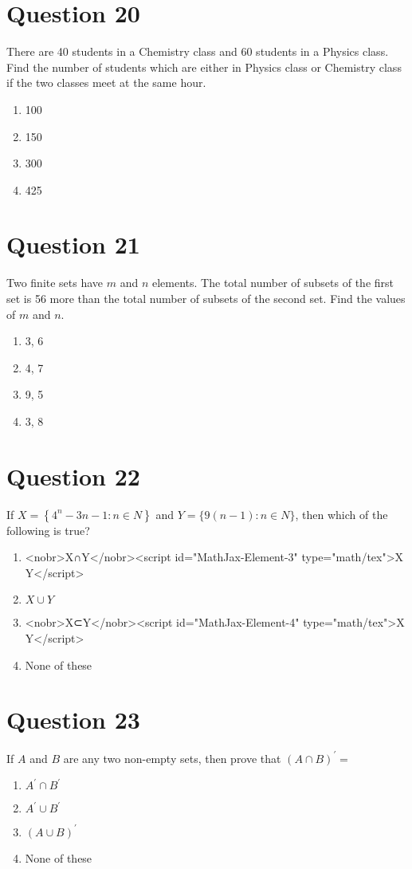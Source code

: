 \documentclass{article}
\begin{document}
\section*{Question 20}
There are 40 students in a Chemistry class and 60 students in a Physics class. Find the number of students which are either in Physics class or Chemistry class if the two classes meet at the same hour.
\begin{enumerate}[label=(\alph*)]
\item 100
\item 150
\item 300
\item 425
\end{enumerate}
\newpage
\section*{Question 21}
Two finite sets have \(m\) and \(n\) elements. The total number of subsets of the first set is 56 more than the total number of subsets of the second set. Find the values of \(m\) and \(n\).
\begin{enumerate}[label=(\alph*)]
\item 3, 6
\item 4, 7
\item 9, 5
\item 3, 8
\end{enumerate}
\newpage
\section*{Question 22}
If \(X=\left\{4^n-3 n-1: n \in N\right\} \) and \(Y=\{9(n-1): n \in N\}\), then which of the following is true?
\begin{enumerate}[label=(\alph*)]
\item <nobr>X∩Y</nobr><script id="MathJax-Element-3" type="math/tex">X \cap Y</script>
\item \(X \cup Y\)
\item <nobr>X⊂Y</nobr><script id="MathJax-Element-4" type="math/tex">X \subset Y</script>
\item None of these
\end{enumerate}
\newpage
\section*{Question 23}
If \(A\) and \(B\) are any two non-empty sets, then prove that \((A \cap B)^{\prime}=\)
\begin{enumerate}[label=(\alph*)]
\item \(A^{\prime} \cap B^{\prime}\)
\item \(A^{\prime} \cup B^{\prime}\)
\item \((A \cup B)^{\prime}\)
\item None of these
\end{enumerate}
\newpage
\end{document}
